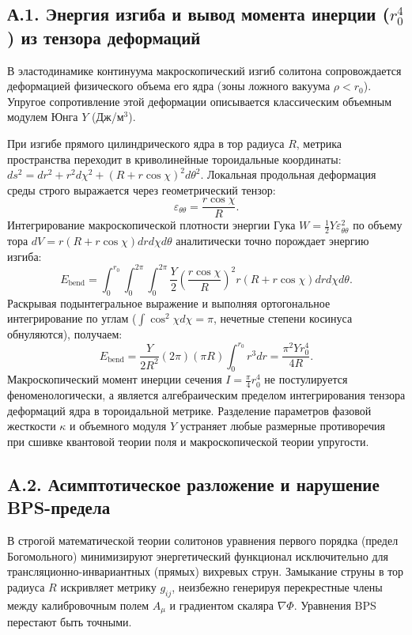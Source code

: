 \documentclass[11pt,a4paper]{article}
\begin{document}
	\subsection*{А.1. Энергия изгиба и вывод момента инерции ($r_0^4$) из тензора деформаций}
	В эластодинамике континуума макроскопический изгиб солитона сопровождается деформацией физического объема его ядра (зоны ложного вакуума $\rho < r_0$). Упругое сопротивление этой деформации описывается классическим объемным модулем Юнга $Y$ (Дж/м$^3$).
	
	При изгибе прямого цилиндрического ядра в тор радиуса $R$, метрика пространства переходит в криволинейные тороидальные координаты: $ds^2 = dr^2 + r^2 d\chi^2 + (R + r\cos\chi)^2 d\theta^2$.
	Локальная продольная деформация среды строго выражается через геометрический тензор:
	\begin{equation}
		\varepsilon_{\theta\theta} = \frac{r \cos\chi}{R}.
	\end{equation}
	Интегрирование макроскопической плотности энергии Гука $W = \frac{1}{2} Y \varepsilon_{\theta\theta}^2$ по объему тора $dV = r(R + r\cos\chi) dr d\chi d\theta$ аналитически точно порождает энергию изгиба:
	\begin{equation}
		E_{\text{bend}} = \int_0^{r_0} \int_0^{2\pi} \int_0^{2\pi} \frac{Y}{2} \left( \frac{r \cos\chi}{R} \right)^2 r(R + r\cos\chi) dr d\chi d\theta.
	\end{equation}
	Раскрывая подынтегральное выражение и выполняя ортогональное интегрирование по углам ($\int \cos^2\chi d\chi = \pi$, нечетные степени косинуса обнуляются), получаем:
	\begin{equation}
		E_{\text{bend}} = \frac{Y}{2 R^2} (2\pi) (\pi R) \int_0^{r_0} r^3 dr = \frac{\pi^2 Y r_0^4}{4 R}.
	\end{equation}
	Макроскопический момент инерции сечения $I = \frac{\pi}{4} r_0^4$ не постулируется феноменологически, а является алгебраическим пределом интегрирования тензора деформаций ядра в тороидальной метрике. Разделение параметров фазовой жесткости $\kappa$ и объемного модуля $Y$ устраняет любые размерные противоречия при сшивке квантовой теории поля и макроскопической теории упругости.
	
	\subsection*{A.2. Асимптотическое разложение и нарушение BPS-предела}
	В строгой математической теории солитонов уравнения первого порядка (предел Богомольного) минимизируют энергетический функционал исключительно для трансляционно-инвариантных (прямых) вихревых струн. Замыкание струны в тор радиуса $R$ искривляет метрику $g_{ij}$, неизбежно генерируя перекрестные члены между калибровочным полем $A_\mu$ и градиентом скаляра $\nabla \Phi$. Уравнения BPS перестают быть точными.
	
\end{document}

